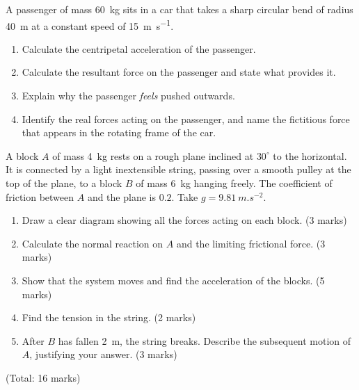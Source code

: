 \documentclass[11pt]{article}
\newcounter{popsec}
\newcounter{popsub}
\newcommand{\courssub}[1]{%
  \stepcounter{popsub}%
  \par\vspace{9pt}\noindent{\popxbold\fontsize{11.5}{13}\selectfont\color{popink}{\color{poporange}\thepopsec.\thepopsub}\hspace{6pt}#1}\par\nopagebreak\vspace{4pt}
}
\begin{document}
\begin{exercice}
A passenger of mass \SI{60}{kg} sits in a car that takes a sharp circular bend of radius \SI{40}{m} at a constant speed of \SI{15}{m.s^{-1}}.
\begin{enumerate}
\item Calculate the centripetal acceleration of the passenger.
\item Calculate the resultant force on the passenger and state what provides it.
\item Explain why the passenger \emph{feels} pushed outwards.
\item Identify the real forces acting on the passenger, and name the fictitious force that appears in the rotating frame of the car.
\end{enumerate}
\end{exercice}

\courssub{I prepare for the GCE}

\begin{exercice}
A block $A$ of mass \SI{4}{kg} rests on a rough plane inclined at $30^{\circ}$ to the horizontal. It is connected by a light inextensible string, passing over a smooth pulley at the top of the plane, to a block $B$ of mass \SI{6}{kg} hanging freely. The coefficient of friction between $A$ and the plane is $0.2$. Take $g = \SI{9.81}{m.s^{-2}}$.
\begin{enumerate}
\item Draw a clear diagram showing all the forces acting on each block. \hfill (3 marks)
\item Calculate the normal reaction on $A$ and the limiting frictional force. \hfill (3 marks)
\item Show that the system moves and find the acceleration of the blocks. \hfill (5 marks)
\item Find the tension in the string. \hfill (2 marks)
\item After $B$ has fallen \SI{2}{m}, the string breaks. Describe the subsequent motion of $A$, justifying your answer. \hfill (3 marks)
\end{enumerate}
\hfill (Total: 16 marks)
\end{exercice}
\end{document}
